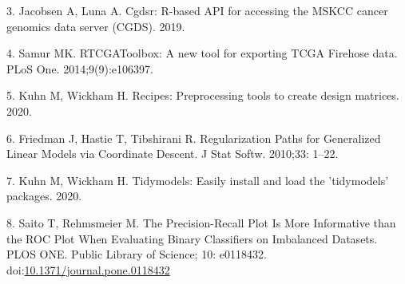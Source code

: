 \documentclass[10pt,letterpaper]{article}
\begin{document}
\leavevmode\hypertarget{ref-jacobsenCgdsrRbasedAPI2019}{}%
3. Jacobsen A, Luna A. Cgdsr: R-based API for accessing the MSKCC cancer
genomics data server (CGDS). 2019.

\leavevmode\hypertarget{ref-samurRTCGAToolboxNewTool2014}{}%
4. Samur MK. RTCGAToolbox: A new tool for exporting TCGA Firehose data.
PLoS One. 2014;9(9):e106397.

\leavevmode\hypertarget{ref-kuhnRecipesPreprocessingTools2020}{}%
5. Kuhn M, Wickham H. Recipes: Preprocessing tools to create design
matrices. 2020.

\leavevmode\hypertarget{ref-friedmanRegularizationPathsGeneralized2010}{}%
6. Friedman J, Hastie T, Tibshirani R. Regularization Paths for
Generalized Linear Models via Coordinate Descent. J Stat Softw. 2010;33:
1--22.

\leavevmode\hypertarget{ref-kuhnTidymodelsEasilyInstall2020}{}%
7. Kuhn M, Wickham H. Tidymodels: Easily install and load the
'tidymodels' packages. 2020.

\leavevmode\hypertarget{ref-saitoPrecisionRecallPlotMore2015}{}%
8. Saito T, Rehmsmeier M. The Precision-Recall Plot Is More Informative
than the ROC Plot When Evaluating Binary Classifiers on Imbalanced
Datasets. PLOS ONE. Public Library of Science; 10: e0118432.
doi:\href{https://doi.org/10.1371/journal.pone.0118432}{10.1371/journal.pone.0118432}

\nolinenumbers
\end{document}
